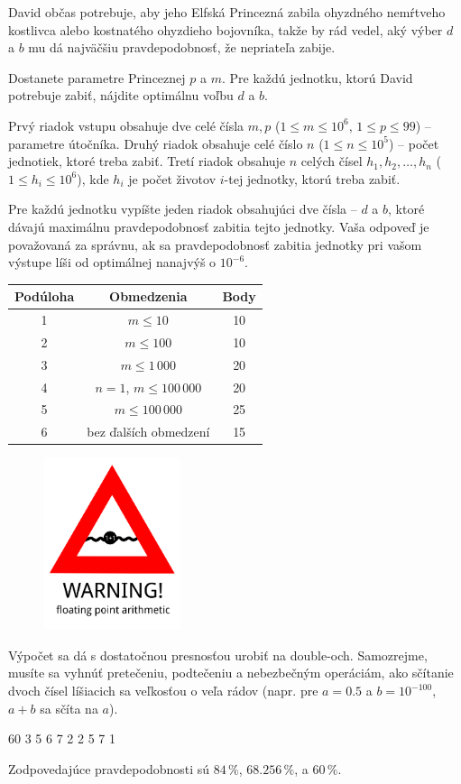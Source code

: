 David občas potrebuje, aby jeho Elfská Princezná zabila ohyzdného nemŕtveho kostlivca alebo kostnatého
ohyzdieho bojovníka, takže by rád vedel, aký výber $d$ a $b$ mu dá najväčšiu pravdepodobnosť, že
nepriateľa zabije.


Dostanete parametre Princeznej $p$ a $m$.
Pre každú jednotku, ktorú David potrebuje zabiť, nájdite optimálnu voľbu $d$ a $b$.


Prvý riadok vstupu obsahuje dve celé čísla $m, p$ ($1\leq m\leq 10^6$, $1\leq p\leq 99$) -- parametre
útočníka. Druhý riadok obsahuje celé číslo $n$ ($1\leq n\leq 10^5$) -- počet jednotiek, ktoré treba zabiť. Tretí riadok obsahuje $n$ celých čísel $h_1,h_2,\dots,h_n$ ($1\leq h_i\leq 10^6$),
kde $h_i$ je počet životov $i$-tej jednotky, ktorú treba zabiť.



Pre každú jednotku vypíšte jeden riadok obsahujúci dve čísla -- $d$ a $b$, ktoré dávajú maximálnu pravdepodobnosť zabitia tejto jednotky.
Vaša odpoveď je považovaná za správnu, ak sa pravdepodobnosť zabitia jednotky pri vašom výstupe líši od optimálnej
nanajvýš o $10^{-6}$.

\begin{center}
\begin{tabular}{|c|c|c|}
	\hline
	Podúloha & Obmedzenia  & Body \\
	\hline
	1 & $m \leq 10$ & 10 \\
	\hline
	2 & $m \leq 100$ & 10 \\
	\hline
	3 & $m \leq 1\,000$ & 20 \\
	\hline
	4 & $n=1$, $m\leq 100\,000$ & 20 \\
	\hline
	5 & $m \leq 100\,000$ & 25 \\
	\hline
	6 & bez ďalších obmedzení & 15 \\
	\hline
\end{tabular}
\end{center}

\newpage
\begin{figure}
\includegraphics[width=4cm]{img/wesnoth_warning}
\end{figure}
\bigskip
\bigskip
Výpočet sa dá s dostatočnou presnosťou urobiť na double-och.
Samozrejme, musíte sa vyhnúť pretečeniu, podtečeniu a nebezbečným operáciám,
ako sčítanie dvoch čísel líšiacich sa veľkosťou o veľa rádov (napr. pre $a=0.5$ a $b=10^{-100}$,
$a+b$ sa sčíta na $a$).
\bigskip
\bigskip
\bigskip
\bigskip
{}

 60
3
5 6 7
 2
2 5
7 1

\sampleEND

Zodpovedajúce pravdepodobnosti sú $84\,\%$, $68.256\,\%$, a $60\,\%$.

